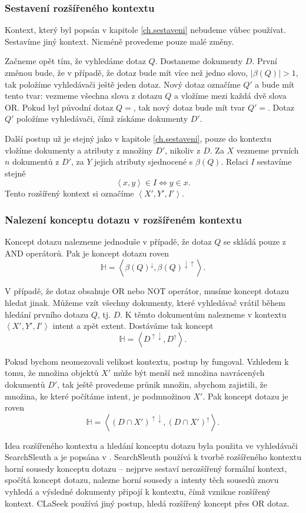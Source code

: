 \documentclass[12pt]{article}
\newcommand{\name}{CLaSeek}
\newcommand{\sssection}[1]{\subsubsection{#1}}
\newcommand{\addsp}[1]{\left<#1\right>}
\newcommand{\up}{^{\uparrow}}
\newcommand{\down}{^{\downarrow}}
\newcommand{\updown}{^{\uparrow\downarrow}}
\newcommand{\downup}{^{\downarrow\uparrow}}
\newcommand{\hledany}{\mathbb{H}}
\begin{document}
\sssection{Sestavení rozšířeného kontextu}
Kontext, který byl popsán v kapitole \ref{ch.sestaveni} nebudeme vůbec používat. Sestavíme jiný kontext. Nicméně provedeme pouze malé změny. 

Začneme opět tím, že vyhledáme dotaz $Q$. Dostaneme dokumenty $D$. První změnou bude, že v případě, že dotaz bude mít více než jedno slovo, $|\beta(Q)|>1$, tak položíme vyhledávači ještě jeden dotaz. Nový dotaz označíme $Q'$ a bude mít tento tvar: vezmeme všechna slova z dotazu $Q$ a vložíme mezi každá dvě slova OR. Pokud byl původní dotaz $Q=$, tak nový dotaz bude mít tvar $Q'=$. Dotaz $Q'$ položíme vyhledávači, čímž získáme dokumenty $D'$.

Další postup už je stejný jako v kapitole \ref{ch.sestaveni}, pouze do kontextu vložíme dokumenty a atributy z množiny $D'$, nikoliv z $D$. Za $X$ vezmeme prvních $n$ dokumentů z $D'$, za $Y$ jejich atributy sjednocené s $\beta(Q)$. Relaci $I$ sestavíme stejně
$$
\addsp{x,y} \in I \iff y \in x.
$$
Tento rozšířený kontext si označíme $\addsp{X', Y', I'}$. 

\sssection{Nalezení konceptu dotazu v rozšířeném kontextu}
Koncept dotazu nalezneme jednoduše v případě, že dotaz $Q$ se skládá pouze z AND operátorů. Pak je koncept dotazu roven
$$
\hledany=\addsp{\beta(Q)\down, \beta(Q)\downup}.
$$

V případě, že dotaz obsahuje OR nebo NOT operátor, musíme koncept dotazu hledat jinak. Můžeme vzít všechny dokumenty, které vyhledávač vrátil během hledání prvního dotazu $Q$, tj. $D$. K těmto dokumentům nalezneme v kontextu $\addsp{X', Y', I'}$ intent a zpět extent. Dostáváme tak koncept
$$
\hledany=\addsp{D\updown, D\up}.
$$

Pokud bychom neomezovali velikost kontextu, postup by fungoval. Vzhledem k tomu, že množina objektů $X'$ může být menší než množina navrácených dokumentů $D'$, tak ještě provedeme průnik množin, abychom zajistili, že množina, ke které počítáme intent, je podmnožinou $X'$. Pak koncept dotazu je roven
$$
\hledany=\addsp{(D\cap X')\updown, (D\cap X')\up}.
$$

Idea rozšířeného kontextu a hledání konceptu dotazu byla použita ve vyhledávači SearchSleuth a je popsána v \cite{searchsleuth}. Search\-Sleuth používá k tvorbě rozšířeného kontextu horní sousedy konceptu dotazu -- nejprve sestaví nerozšířený formální kontext, spočítá koncept dotazu, nalezne horní sousedy a intenty těch sousedů znovu vyhledá a výsledné dokumenty připojí k kontextu, čímž vznikne rozšířený kontext. \name{} používá jiný postup, hledá rozšířený koncept přes OR dotaz. 
\end{document}
